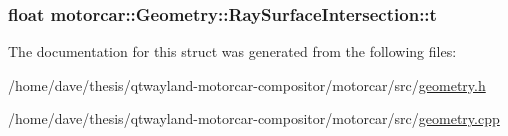 \hypertarget{structmotorcar_1_1Geometry_1_1RaySurfaceIntersection_af32545772aead85519b20869fbc34284}{
\subsubsection[{t}]{\setlength{\rightskip}{0pt plus 5cm}float motorcar\-::\-Geometry\-::\-Ray\-Surface\-Intersection\-::t}}\label{structmotorcar_1_1Geometry_1_1RaySurfaceIntersection_af32545772aead85519b20869fbc34284}


The documentation for this struct was generated from the following files\-:\begin{DoxyCompactItemize}
\item 
/home/dave/thesis/qtwayland-\/motorcar-\/compositor/motorcar/src/\hyperlink{geometry_8h}{geometry.\-h}\item 
/home/dave/thesis/qtwayland-\/motorcar-\/compositor/motorcar/src/\hyperlink{geometry_8cpp}{geometry.\-cpp}\end{DoxyCompactItemize}
